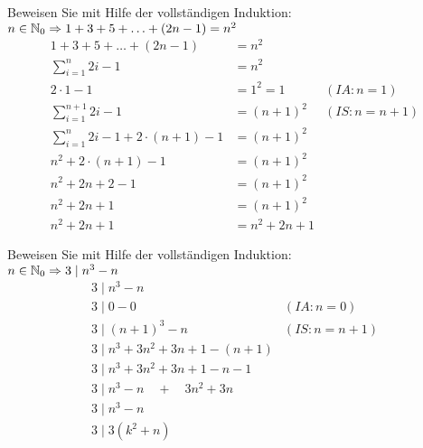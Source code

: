 \begin{card}
  Beweisen Sie mit Hilfe der vollständigen Induktion:\\
  $n \in \mathbb{N}_0 \Rightarrow 1 + 3 + 5 + \ldots + (2n - 1) = n^2$
  \hr
  \begin{align*}
    1 + 3 + 5 + \ldots + (2n - 1) &= n^2 \\
    \sum\limits_{i=1}^n 2i - 1 &= n^2 \\
    2 \cdot 1 - 1 &= 1^2 = 1 & (IA: n=1) \\
    \sum\limits_{i=1}^{n+1} 2i - 1 &= (n+1)^2 & (IS: n=n+1) \\
    \sum\limits_{i=1}^{n} 2i - 1 + 2 \cdot (n+1) - 1 &= (n+1)^2 & \\
    n^2 + 2 \cdot (n+1) - 1 &= (n+1)^2 & \\
    n^2 + 2n + 2 - 1 &= (n+1)^2 & \\
    n^2 + 2n + 1 &= (n+1)^2 & \\
    n^2 + 2n + 1 &= n^2 + 2n + 1
  \end{align*}
\end{card}

\begin{card}
  Beweisen Sie mit Hilfe der vollständigen Induktion:\\
  $n \in \mathbb{N}_0 \Rightarrow 3 \mid n^3 - n$
  \hr
  \begin{align*}
    3 \mid n^3 - n & \\
    3 \mid 0 - 0 & (IA: n=0) \\
    3 \mid (n+1)^3 - n & (IS: n=n+1) \\
    3 \mid n^3 + 3n^2 + 3n + 1 - (n+1) & \\
    3 \mid n^3 + 3n^2 + 3n + 1 - n - 1 & \\
    3 \mid n^3 - n \quad + \quad 3n^2 + 3n & \\
    3 \mid n^3 - n & \\
    3 \mid 3(k^2 + n) & \\
  \end{align*}
\end{card}

